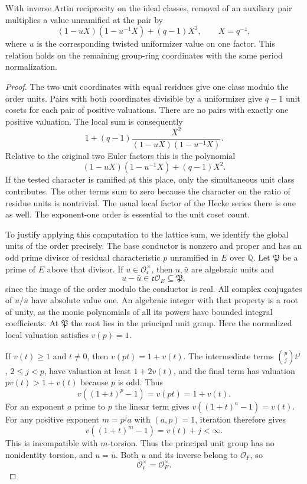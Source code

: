\begin{lemma}\label{lem:toric-split-distribution}
With inverse Artin reciprocity on the ideal classes, removal of an
auxiliary pair multiplies a value unramified at the pair by
\[
       (1-uX)(1-u^{-1}X)+(q-1)X^2,\qquad X=q^{-z},
\]
where \(u\) is the corresponding twisted uniformizer value on
one factor. This relation holds on the remaining group-ring
coordinates with the same period normalization.
\end{lemma}

\begin{proof}
The two unit coordinates with equal residues give one
class modulo the order units. Pairs with both
coordinates divisible by a uniformizer give \(q-1\)
unit cosets for each pair of positive valuations.
There are no pairs with exactly one positive valuation.
The local sum is consequently
\[
     1+(q-1)\frac{X^2}{(1-uX)(1-u^{-1}X)} .
\]
Relative to the original two Euler factors this is the
polynomial
\[
          (1-uX)(1-u^{-1}X)+(q-1)X^2 .
\]
If the tested character is ramified at this place,
only the simultaneous unit class contributes. The other
terms sum to zero because the character on the ratio of
residue units is nontrivial. The usual local factor of
the Hecke series there is one as well. The exponent-one
order is essential to the unit coset count.

To justify applying this computation to the lattice sum,
we identify the global units of the order precisely.
The base conductor is nonzero and proper and has an odd
prime divisor of residual characteristic \(p\) unramified
in \(E\) over \(\mathbb Q\). Let \(\mathfrak P\) be a prime of
\(E\) above that divisor. If \(u\in\mathcal O_{\mathfrak c}^\times\),
then \(u,\bar u\) are algebraic units and
\[
 u-\bar u\in\mathfrak c\mathcal O_E\subseteq\mathfrak P,
\]
since the image of the order modulo the conductor is real.
All complex conjugates of \(u/\bar u\) have absolute value one.
An algebraic integer with that property is a root of unity,
as the monic polynomials of all its powers have bounded integral
coefficients. At \(\mathfrak P\) the root lies in the principal unit
group. Here the normalized local valuation satisfies \(v(p)=1\).

If \(v(t)\ge1\) and \(t\ne0\), then \(v(pt)=1+v(t)\). The
intermediate terms \(\binom pj t^j\), \(2\le j<p\), have valuation
at least \(1+2v(t)\), and the final term has valuation \(pv(t)>1+v(t)\)
because \(p\) is odd. Thus
\[
 v((1+t)^p-1)=v(pt)=1+v(t).
\] For an exponent \(a\) prime to \(p\) the linear term
gives \(v((1+t)^a-1)=v(t)\). For any positive exponent
\(m=p^j a\) with \((a,p)=1\), iteration therefore gives
\[
                  v((1+t)^m-1)=v(t)+j<\infty .
\]
This is incompatible with \(m\)-torsion.
Thus the principal unit group has no nonidentity torsion, and
\(u=\bar u\). Both \(u\) and its inverse belong to \(\mathcal O_F\),
so
\[
 \mathcal O_{\mathfrak c}^\times=\mathcal O_F^\times.
\]



\end{proof}
